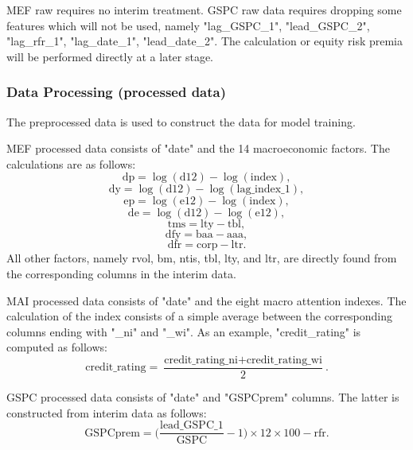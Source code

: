 \documentclass{article}
\begin{document}
MEF raw requires no interim treatment. GSPC raw data requires dropping some features which will not be used, namely "lag\_GSPC\_1", "lead\_GSPC\_2", "lag\_rfr\_1", "lag\_date\_1", "lead\_date\_2". The calculation or equity risk premia will be performed directly at a later stage.

\subsubsection{Data Processing (processed data)}
The preprocessed data is used to construct the data for model training.

MEF processed data consists of "date" and the 14 macroeconomic factors. The calculations are as follows:
\begin{equation*}
    \text{dp} = \log{(\text{d12})} - \log{(\text{index})},
\end{equation*}
\begin{equation*}
    \text{dy} = \log{(\text{d12})} - \log{(\text{lag\_index\_1})},
\end{equation*}
\begin{equation*}
    \text{ep} = \log{(\text{e12})} - \log{(\text{index})},
\end{equation*}
\begin{equation*}
    \text{de} = \log{(\text{d12})} - \log{(\text{e12})},
\end{equation*}
\begin{equation*}
    \text{tms} = \text{lty} - \text{tbl},
\end{equation*}
\begin{equation*}
    \text{dfy} = \text{baa} - \text{aaa},
\end{equation*}
\begin{equation*}
    \text{dfr} = \text{corp} - \text{ltr}.
\end{equation*}
All other factors, namely rvol, bm, ntis, tbl, lty, and ltr, are directly found from the corresponding columns in the interim data.

MAI processed data consists of "date" and the eight macro attention indexes. The calculation of the index consists of a simple average between the corresponding columns ending with "\_ni" and "\_wi". As an example, "credit\_rating" is computed as follows:
\begin{equation*}
    \text{credit\_rating} = \frac{\text{credit\_rating\_ni}+\text{credit\_rating\_wi}}{2}.
\end{equation*}

GSPC processed data consists of "date" and "GSPCprem" columns. The latter is constructed from interim data as follows:
\begin{equation*}
    \text{GSPCprem} = \big( \frac{\text{lead\_GSPC\_1}}{\text{GSPC}}-1 \big) \times 12 \times 100 - \text{rfr}.
\end{equation*}
\end{document}
